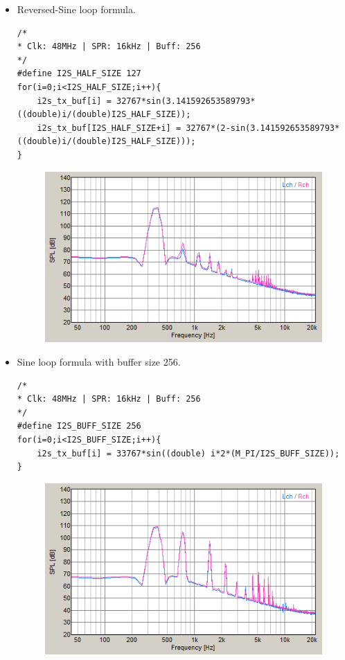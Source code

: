 \documentclass[12pt,]{article}
\begin{document}
\begin{itemize}
\begin{itemize}
			\item Reversed-Sine loop formula.
			\begin{verbatim}
/*
* Clk: 48MHz | SPR: 16kHz | Buff: 256
*/
#define I2S_HALF_SIZE 127	
for(i=0;i<I2S_HALF_SIZE;i++){
	i2s_tx_buf[i] = 32767*sin(3.141592653589793*((double)i/(double)I2S_HALF_SIZE));
	i2s_tx_buf[I2S_HALF_SIZE+i] = 32767*(2-sin(3.141592653589793*((double)i/(double)I2S_HALF_SIZE)));
}
			\end{verbatim}
			\begin{figure}[H]
				\centering
				\includegraphics[width=0.5\linewidth]{result/day_1/halfMax256}
			\end{figure}
		
			\newpage
			\item Sine loop formula with buffer size 256.
			\begin{verbatim}
/*
* Clk: 48MHz | SPR: 16kHz | Buff: 256
*/
#define I2S_BUFF_SIZE 256	
for(i=0;i<I2S_BUFF_SIZE;i++){
	i2s_tx_buf[i] = 33767*sin((double) i*2*(M_PI/I2S_BUFF_SIZE));
}
			\end{verbatim}
			\begin{figure}[H]
				\centering
				\includegraphics[width=0.5\linewidth]{result/day_1/max256}
			\end{figure}
		

\end{itemize}
\end{itemize}
\end{document}
